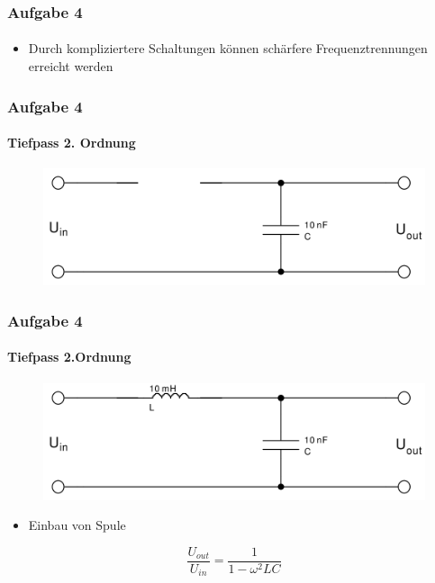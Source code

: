 \begin{frame}
\frametitle{Aufgabe 4}
\framesubtitle{}
    \begin{itemize}
        \item Durch kompliziertere Schaltungen können schärfere
        Frequenztrennungen erreicht werden
    \end{itemize}
\end{frame}
\begin{frame}
\frametitle{Aufgabe 4}
\framesubtitle{Tiefpass 2. Ordnung}
\begin{figure}[H]
\begin{center}
        \includegraphics[scale=0.2]{./img/4a_tiefpass_1.png}
\end{center}
\end{figure}
\end{frame}
\begin{frame}
\frametitle{Aufgabe 4}
\framesubtitle{Tiefpass 2.Ordnung}
\begin{figure}[H]
\begin{center}
        \includegraphics[scale=0.2]{./img/4a_tiefpass_2.png}
\end{center}
\end{figure}
\begin{itemize}
    \item Einbau von Spule
\end{itemize}
\begin{equation*}
    \frac{U_{out}}{U_{in}} = \frac{1}{1-\omega^2 L C}
\end{equation*}
\end{frame}
